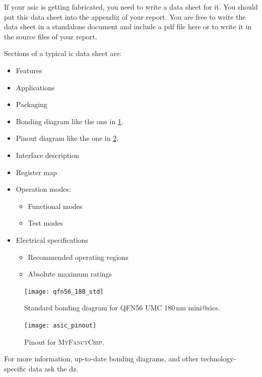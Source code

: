     If your \gls{asic} is getting fabricated, you need to write a data sheet for it.
    You should put this data sheet into the appendix of your report.
    You are free to write the data sheet in a standalone document and include a \gls{pdf} file here or to write it in the source files of your report.

    Sections of a typical \gls{ic} data sheet are:
    \begin{itemize}
      \item Features
      \item Applications
      \item Packaging
      \item Bonding diagram like the one in \cref{fig:bonding_diagram}.
      \item Pinout diagram like the one in \cref{fig:asic_pinout}.
      \item Interface description
      \item Register map
      \item Operation modes:
      \begin{itemize}
        \item Functional modes
        \item Test modes
      \end{itemize}
      \item Electrical specifications
      \begin{itemize}
        \item Recommended operating regions
        \item Absolute maximum ratings
      \end{itemize}
    \end{itemize}

    \begin{figure}
      \centering
      \texttt{[image: qfn56\_180\_std]}
      \caption{Standard bonding diagram for QFN56 UMC 180\,nm mini@sics.}%
      \label{fig:bonding_diagram}
    \end{figure}

    \begin{figure}
      \centering
      \texttt{[image: asic\_pinout]}
      \caption{Pinout for \textsc{MyFancyChip}.}%
      \label{fig:asic_pinout}
    \end{figure}

    For more information, up-to-date bonding diagrams, and other technology-specific data ask the \gls{dz}.
